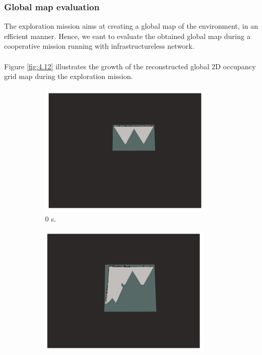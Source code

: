 \documentclass[11pt,openany]{book}
\begin{document}
\subsubsection{Global map evaluation}
The exploration mission aims at creating a global map of the environment, in an efficient manner. Hence, we eant to evaluate the obtained global map during a cooperative mission running with infrastructureless network.\\\\
Figure \ref{fig:4.12} illustrates the growth of the reconstructed global 2D occupancy grid map during the exploration mission.
\begin{figure}[H]
    \centering
    \begin{subfigure}[H]{0.3\linewidth}
        \includegraphics[width=\linewidth]{assets/4_12_a.png}
        \caption{{0 s.}}
        \label{fig:4.12a}
    \end{subfigure}
    \begin{subfigure}[H]{0.3\linewidth}
        \includegraphics[width=\linewidth]{assets/4_12_b.png}

\end{subfigure}
\end{figure}
\end{document}
